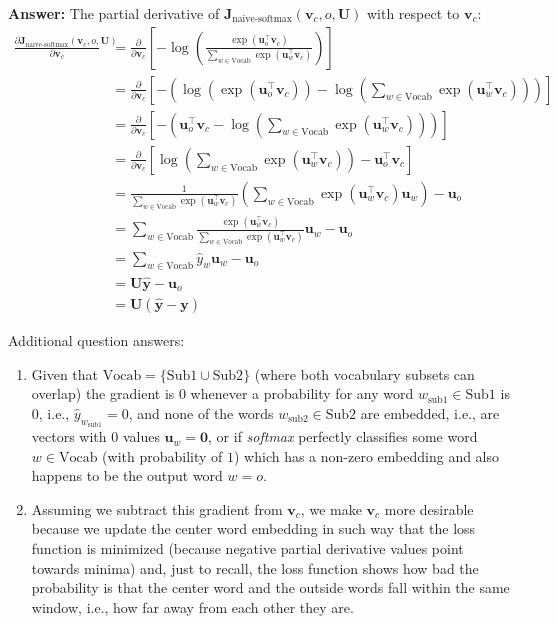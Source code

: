 \documentclass{article}
\newenvironment{answer}{
    {\bf Answer:} \sf \begingroup\color{red}
}{\endgroup}%
\begin{document}
\begin{enumerate}[label=(\alph*)]
\begin{shaded}
\begin{answer} The partial derivative of $\bm J_{\text{naive-softmax}}(\bm v_c, o, \bm U)$ with respect to $\bm v_c$:
\begin{align}
\frac{\partial \bm J_{\text{naive-softmax}}(\bm v_c, o, \bm U)}{\partial \bm v_c} &= \frac{\partial}{\partial \bm v_c} \left[-\log\left(\frac{\exp(\bm u_{o}^\top \bm v_c)}{\sum_{w \in \text{Vocab}} \exp(\bm u_{w}^\top \bm v_c)} \right)\right] \\
&=\frac{\partial}{\partial \bm v_c} \left[- \left(\log\left(\exp(\bm u_{o}^\top \bm v_c)\right) - \log\left(\sum_{w \in \text{Vocab}} \exp(\bm u_{w}^\top \bm v_c)\right)\right)\right] \\
&=\frac{\partial}{\partial \bm v_c} \left[- \left(\bm u_{o}^\top \bm v_c - \log\left(\sum_{w \in \text{Vocab}} \exp(\bm u_{w}^\top \bm v_c)\right)\right)\right] \\
&=\label{simplification}\frac{\partial}{\partial \bm v_c} \left[\log\left(\sum_{w \in \text{Vocab}} \exp(\bm u_{w}^\top \bm v_c)\right)-\bm u_{o}^\top \bm v_c\right] \\
&=\frac{1}{\sum_{w \in \text{Vocab}} \exp(\bm u_{w}^\top \bm v_c)}\left(\sum_{w \in \text{Vocab}} \exp(\bm u_{w}^\top \bm v_c)\bm u_w\right) - \bm u_o \\
&= \sum_{w \in \text{Vocab}} \frac{\exp(\bm u_{w}^\top \bm v_c)}{\sum_{w \in \text{Vocab}} \exp(\bm u_{w}^\top \bm v_c)}\bm u_w - \bm u_o \\
&= \sum_{w \in \text{Vocab}} \hat{y}_w \bm u_w - \bm u_o \\
&= \bm U \hat{\bm y} - \bm u_o \\
&= \bm U (\hat{\bm y} - \bm y)
\end{align}

\hfill

\color{red} Additional question answers:
\begin{enumerate}[label=(\roman*)]
    \item Given that $\text{Vocab}=\{\text{Sub1} \cup \text{Sub2}\}$ (where both vocabulary subsets can overlap) the gradient is $0$ whenever a probability for any word $w_{\text{sub1}}\in \text{Sub1}$ is $0$, i.e., $\hat{y}_{w_{\text{sub1}}}=0$, and none of the words $w_{\text{sub2}}\in \text{Sub2}$ are embedded, i.e., are vectors with $0$ values $\bm u_w = \bm 0$, or if \textit{softmax} perfectly classifies some word $w\in\text{Vocab}$ (with probability of $1$) which has a non-zero embedding and also happens to be the output word $w=o$.
    \item Assuming we subtract this gradient from $\bm v_c$, we make $\bm v_c$ more desirable because we update the center word embedding in such way that the loss function is minimized (because negative partial derivative values point towards minima) and, just to recall, the loss function shows how bad the probability is that the center word and the outside words fall within the same window, i.e., how far away from each other they are.
\end{enumerate}


\end{answer}
\end{shaded}
\end{enumerate}
\end{document}
